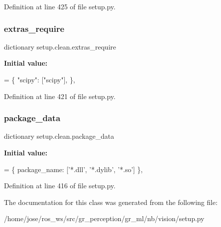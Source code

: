 Definition at line 425 of file setup.\+py.

\mbox{\label{classsetup_1_1clean_adbd43bca420849375c14287e4d0142de}} 
\subsubsection{\texorpdfstring{extras\+\_\+require}{extras\_require}}
{\footnotesize\ttfamily dictionary setup.\+clean.\+extras\+\_\+require\hspace{0.3cm}{\ttfamily [static]}}

{\bfseries Initial value\+:}
\begin{DoxyCode}
= \{
        \textcolor{stringliteral}{"scipy"}: [\textcolor{stringliteral}{"scipy"}],
    \},
\end{DoxyCode}


Definition at line 421 of file setup.\+py.

\mbox{\label{classsetup_1_1clean_a8dfea6073994070ab850f277315c7162}} 
\subsubsection{\texorpdfstring{package\+\_\+data}{package\_data}}
{\footnotesize\ttfamily dictionary setup.\+clean.\+package\+\_\+data\hspace{0.3cm}{\ttfamily [static]}}

{\bfseries Initial value\+:}
\begin{DoxyCode}
= \{
        package\_name: [\textcolor{stringliteral}{'*.dll'}, \textcolor{stringliteral}{'*.dylib'}, \textcolor{stringliteral}{'*.so'}]
    \},
\end{DoxyCode}


Definition at line 416 of file setup.\+py.



The documentation for this class was generated from the following file\+:\begin{DoxyCompactItemize}
\item 
/home/jose/ros\+\_\+ws/src/gr\+\_\+perception/gr\+\_\+ml/nb/vision/setup.\+py\end{DoxyCompactItemize}
